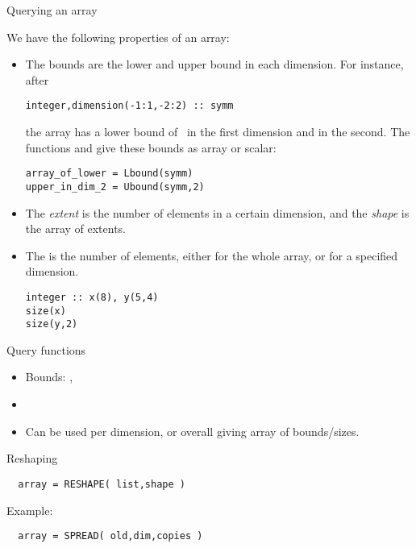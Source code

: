  {Querying an array}

We have the following properties of an array:
\begin{itemize}
\item The bounds are the lower and upper bound in each dimension.
  For instance, after
\begin{lstlisting}
integer,dimension(-1:1,-2:2) :: symm
\end{lstlisting}
the array  has a lower bound of~ in the first dimension
and  in the second. The functions  and
 give these bounds as array or scalar:
\begin{lstlisting}
array_of_lower = Lbound(symm)
upper_in_dim_2 = Ubound(symm,2)
\end{lstlisting}


\item The \emph{extent} is the number
  of elements in a certain dimension, and the
  \emph{shape} is the array of extents.

\item The  is the number of elements, either for
  the whole array, or for a specified dimension.
\begin{lstlisting}
integer :: x(8), y(5,4)
size(x)
size(y,2)
\end{lstlisting}
\end{itemize}

\begin{slide}{Query functions}
  \label{sl:farray-query}
  \begin{itemize}
  \item Bounds: , 
  \item {}
  \item Can be used per dimension, or overall giving array of bounds/sizes.
  \end{itemize}
\end{slide}

 {Reshaping}

\begin{lstlisting}
  array = RESHAPE( list,shape )
\end{lstlisting}
Example:

\begin{lstlisting}
  array = SPREAD( old,dim,copies )
\end{lstlisting}

